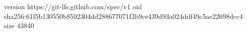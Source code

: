 version https://git-lfs.github.com/spec/v1
oid sha256:61f5b130550b8592304dd288677071f3b9ce439d93a024ddf49c5ae22698dcc4
size 43840
